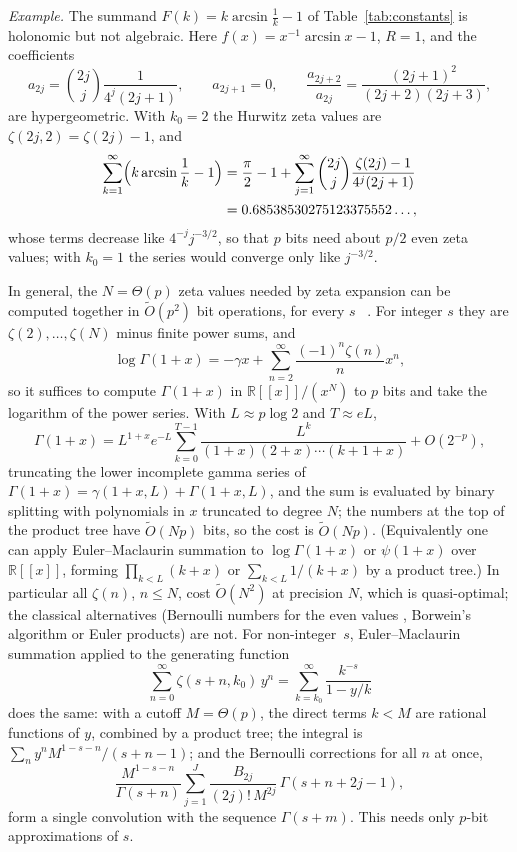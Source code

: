 \documentclass[11pt,reqno]{amsart}
\theoremstyle{definition}
\theoremstyle{remark}
\newcommand{\RR}{\mathbb{R}}
\begin{document}
\emph{Example.} The summand $F(k) = k\arcsin\frac1k - 1$ of Table~\ref{tab:constants} is holonomic but not algebraic.
Here $f(x) = x^{-1}\arcsin x - 1$, $R = 1$, and the coefficients
\[
  a_{2j} = \binom{2j}{j}\frac{1}{4^j(2j+1)}, \qquad a_{2j+1} = 0, \qquad \frac{a_{2j+2}}{a_{2j}} = \frac{(2j+1)^2}{(2j+2)(2j+3)},
\]
are hypergeometric. With $k_0 = 2$ the Hurwitz zeta values are $\zeta(2j,2) = \zeta(2j) - 1$, and
\begin{align*}
  \sum_{k=1}^{\infty}\Bigl(k\arcsin\frac1k - 1\Bigr) &= \frac\pi2 - 1 + \sum_{j=1}^{\infty}\binom{2j}{j}\frac{\zeta(2j) - 1}{4^j(2j+1)} \\
  &= 0.68538530275123375552\ldots,
\end{align*}
whose terms decrease like $4^{-j}j^{-3/2}$, so that $p$ bits need about $p/2$ even zeta values; with $k_0 = 1$ the
series would converge only like $j^{-3/2}$.

In general, the $N = \Theta(p)$ zeta values needed by zeta
expansion can be computed together in $\widetilde O(p^2)$ bit operations, for every $s$~ \cite{Joh14}. For
integer $s$ they are $\zeta(2), \dots, \zeta(N)$ minus finite power sums, and
\[
  \log\Gamma(1+x) = -\gamma x + \sum_{n=2}^{\infty}\frac{(-1)^n\zeta(n)}{n}x^n,
\]
so it suffices to compute $\Gamma(1+x)$ in $\RR[[x]]/(x^N)$ to $p$ bits and take the logarithm of the power series.
With $L \approx p\log 2$ and $T \approx eL$,
\[
  \Gamma(1+x) = L^{1+x}e^{-L}\sum_{k=0}^{T-1}\frac{L^k}{(1+x)(2+x)\cdots(k+1+x)} + O(2^{-p}),
\]
truncating the lower incomplete gamma series of $\Gamma(1+x) = \gamma(1+x,L) + \Gamma(1+x,L)$, and the sum is evaluated by
binary splitting with polynomials in $x$ truncated to degree $N$; the numbers at the top of the product tree have
$\widetilde O(Np)$ bits, so the cost is $\widetilde O(Np)$. (Equivalently one can apply Euler--Maclaurin summation to
$\log\Gamma(1+x)$ or $\psi(1+x)$ over $\RR[[x]]$, forming $\prod_{k<L}(k+x)$ or $\sum_{k<L}1/(k+x)$ by a product tree.) In
particular all $\zeta(n)$, $n \le N$, cost $\widetilde O(N^2)$ at precision $N$, which is quasi-optimal;
the classical alternatives (Bernoulli numbers for the even values \cite{Har10}, Borwein's algorithm \cite{Bor00} or
Euler products) are not. For non-integer~$s$, Euler--Maclaurin summation applied to the generating
function
\[
  \sum_{n=0}^{\infty}\zeta(s+n,k_0)\,y^n = \sum_{k=k_0}^{\infty}\frac{k^{-s}}{1-y/k}
\]
does the same: with a cutoff $M = \Theta(p)$, the direct terms $k < M$ are rational functions of $y$, combined by a
product tree; the integral is $\sum_ny^nM^{1-s-n}/(s+n-1)$; and the Bernoulli corrections for all $n$ at once,
\[
  \frac{M^{1-s-n}}{\Gamma(s+n)}\sum_{j=1}^{J}\frac{B_{2j}}{(2j)!\,M^{2j}}\,\Gamma(s+n+2j-1),
\]
form a single convolution with the sequence $\Gamma(s+m)$. This needs only $p$-bit approximations of $s$.
\end{document}
